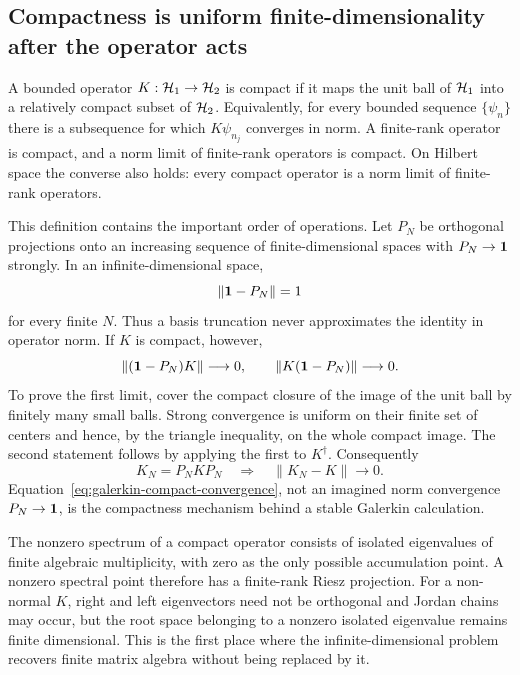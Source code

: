 \subsection{Compactness is uniform finite-dimensionality after the operator acts}
\label{subsec:compact-operators}

A bounded operator $K:\mathcal{H}_1\to\mathcal{H}_2$ is compact if it maps the unit ball of
$\mathcal{H}_1$ into a relatively compact subset of $\mathcal{H}_2$.  Equivalently, for
every bounded sequence $\{\psi_n\}$ there is a subsequence for which
$K\psi_{n_j}$ converges in norm.  A finite-rank operator is compact, and a
norm limit of finite-rank operators is compact.  On Hilbert space the
converse also holds: every compact operator is a norm limit of finite-rank
operators.

This definition contains the important order of operations.  Let $P_N$ be
orthogonal projections onto an increasing sequence of finite-dimensional
spaces with $P_N\to\mathbf{1}$ strongly.  In an infinite-dimensional space,
\begin{equation}
  \|\mathbf{1}-P_N\|=1
  \label{eq:projection-not-norm-identity}
\end{equation}
for every finite $N$.  Thus a basis truncation never approximates the
identity in operator norm.  If $K$ is compact, however,
\begin{equation}
  \|(\mathbf{1}-P_N)K\|\longrightarrow0,
  \qquad
  \|K(\mathbf{1}-P_N)\|\longrightarrow0.
  \label{eq:compact-projection-norm}
\end{equation}
To prove the first limit, cover the compact closure of the image of the unit
ball by finitely many small balls.  Strong convergence is uniform on their
finite set of centers and hence, by the triangle inequality, on the whole
compact image.  The second statement follows by applying the first to
$K^\dagger$.  Consequently
\begin{equation}
  K_N=P_NKP_N
  \quad\Longrightarrow\quad
  \|K_N-K\|\to0 .
  \label{eq:galerkin-compact-convergence}
\end{equation}
Equation~\eqref{eq:galerkin-compact-convergence}, not an imagined norm
convergence $P_N\to\mathbf{1}$, is the compactness mechanism behind a stable
Galerkin calculation.

The nonzero spectrum of a compact operator consists of isolated eigenvalues
of finite algebraic multiplicity, with zero as the only possible accumulation
point.  A nonzero spectral point therefore has a finite-rank Riesz projection.
For a non-normal $K$, right and left eigenvectors need not be orthogonal and
Jordan chains may occur, but the root space belonging to a nonzero isolated
eigenvalue remains finite dimensional.  This is the first place where the
infinite-dimensional problem recovers finite matrix algebra without being
replaced by it.

